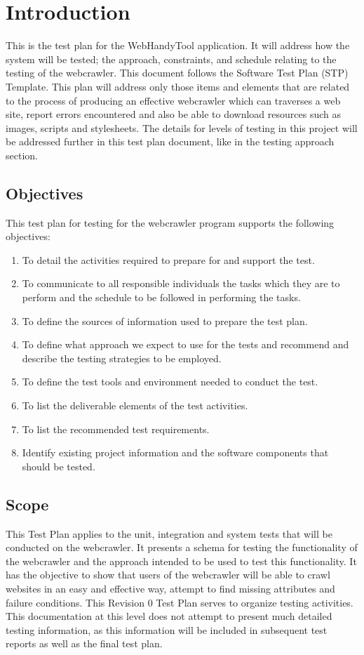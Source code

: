 \documentclass[12pt, titlepage]{article}
\begin{document}
\section{Introduction}
This is the test plan for the WebHandyTool application.  It will address how the system will be tested; the approach, constraints, and schedule relating to the testing of the webcrawler. This document follows the Software Test Plan (STP) Template.
This plan will address only those items and elements that are related to the process of producing an effective webcrawler which can traverses a web site, report errors encountered and also be able to download resources such as images, scripts and stylesheets. The details for levels of testing in this project will be addressed further in this test plan document, like in the testing approach section.

\subsection{Objectives}
This test plan for testing for the webcrawler program supports the following objectives:

\begin{enumerate}
\item To detail the activities required to prepare for and support the test.
\item To communicate to all responsible individuals the tasks which they are to perform and the schedule to be followed in performing the tasks.
\item To define the sources of information used to prepare the test plan.
\item To define what approach we expect to use for the tests and recommend and describe the testing strategies to be employed.
\item To define the test tools and environment needed to conduct the test.
\item To list the deliverable elements of the test activities.
\item  To list the recommended test requirements.
\item  Identify existing project information and the software components that should be tested.
\end{enumerate}

\subsection{Scope}
This Test Plan applies to the unit,  integration and system tests that will be conducted on the webcrawler. It presents a schema for testing the functionality of the webcrawler and the approach intended to be used to test this functionality. It has the objective to show that users of the webcrawler will be able to crawl websites in an easy and effective way, attempt to find missing attributes and failure conditions. This Revision 0 Test Plan serves to organize testing activities. This documentation at this level does not attempt to present much detailed testing information, as this information will be included in subsequent test reports as well as the final test plan.
\end{document}
